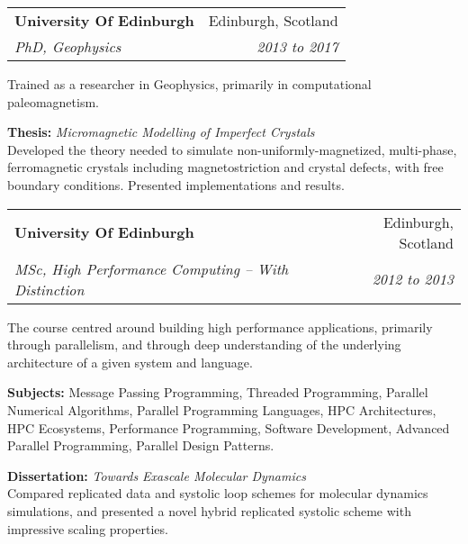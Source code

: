 \documentclass[11pt]{article}
\makeatletter
\newenvironment{resumeSubSectionHeader}{
    \par
    \begin{tabular*}{\textwidth}{l@{\extracolsep{\fill}}r}
    \par
} {
    \end{tabular*}
    \par
}
\newenvironment{resumeSubSectionBody}{
    \par
    \vspace{-0.4\parskip}
    \begin{small}
    \par
} {
    \par
    \end{small}
    \par
}
\newenvironment{resumeDescription}{
    \vspace{-0.5\baselineskip}
    \begin{description}
} {
    \end{description}
}
\makeatother
\begin{document}
%
%
\begin{resumeSubSectionHeader}

    \textbf{University Of Edinburgh}       & Edinburgh, Scotland \\
    \emph{PhD, Geophysics} & \emph{2013 to 2017} \\

\end{resumeSubSectionHeader}
\begin{resumeSubSectionBody}
    Trained as a researcher in Geophysics,
    primarily in computational paleomagnetism.
    \begin{resumeDescription}
        \item{
            {\bf Thesis:}
            \it Micromagnetic Modelling of Imperfect Crystals
        } \\
        Developed the theory needed to simulate non-uniformly-magnetized,
        multi-phase, ferromagnetic crystals including magnetostriction and
        crystal defects, with free boundary conditions.
        Presented implementations and results.
    \end{resumeDescription}
\end{resumeSubSectionBody}

\begin{resumeSubSectionHeader}

    \textbf{University Of Edinburgh}       & Edinburgh, Scotland \\
    \emph{MSc, High Performance Computing -- With Distinction} & \emph{2012 to 2013}

\end{resumeSubSectionHeader}
\begin{resumeSubSectionBody}

    The course centred around building high performance applications,
    primarily through parallelism, and through deep understanding
    of the underlying architecture of a given system and language.

    \begin{resumeDescription}
        \item{\bf Subjects:}
            Message Passing Programming, Threaded Programming,
            Parallel Numerical Algorithms,
            Parallel Programming Languages, HPC Architectures,
            HPC Ecosystems, Performance Programming,
            Software Development, Advanced Parallel Programming,
            Parallel Design Patterns.

        \item{
            {\bf Dissertation:}
            \it Towards Exascale Molecular Dynamics
        } \\
            Compared replicated data and systolic loop schemes for
            molecular dynamics simulations, and presented a novel hybrid
            replicated systolic scheme with impressive scaling properties.
    \end{resumeDescription}

\end{resumeSubSectionBody}
\end{document}
